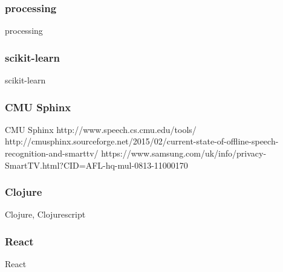 \subsubsection*{processing}
processing

\subsubsection*{scikit-learn}
scikit-learn

\subsubsection*{CMU Sphinx}
CMU Sphinx
http://www.speech.cs.cmu.edu/tools/
http://cmusphinx.sourceforge.net/2015/02/current-state-of-offline-speech-recognition-and-smarttv/
https://www.samsung.com/uk/info/privacy-SmartTV.html?CID=AFL-hq-mul-0813-11000170

\subsubsection*{Clojure}
Clojure, Clojurescript

\subsubsection*{React}
React
